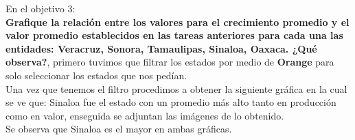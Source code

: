 \item En el objetivo 3: \\ {\bfseries Grafique la relación entre los valores para el crecimiento promedio y el valor promedio establecidos en las tareas anteriores para cada una las entidades: Veracruz, Sonora, Tamaulipas, Sinaloa, Oaxaca. ¿Qué observa?}, primero tuvimos que filtrar los estados por medio de {\bfseries Orange} para solo seleccionar los estados que nos pedían. \\
Una vez que tenemos el filtro procedimos a obtener la siguiente gráfica en la cual se ve que: Sinaloa fue el estado con un promedio más alto tanto en producción como en valor, enseguida se adjuntan las imágenes de lo obtenido.\\
Se observa que Sinaloa es el mayor en ambas gráficas.